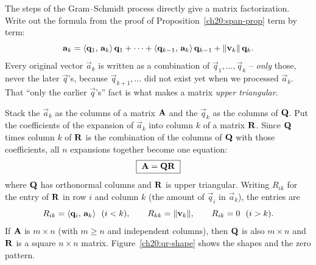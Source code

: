 The steps of the Gram--Schmidt process directly give a matrix factorization.
Write out the formula from the proof of Proposition~\ref{ch20:span-prop} term by term:
\[
  \mathbf{a}_k = \langle \mathbf{q}_1,\, \mathbf{a}_k \rangle\,\mathbf{q}_1
            + \dots
            + \langle \mathbf{q}_{k-1},\, \mathbf{a}_k \rangle\,\mathbf{q}_{k-1}
            + \lVert\mathbf{v}_k\rVert\,\mathbf{q}_k.
\]
Every original vector $\vec{a}_k$ is written as a combination of
$\vec{q}_1,\dots,\vec{q}_k$ -- \emph{only} those, never the later
$\vec{q}$'s, because $\vec{q}_{k+1},\dots$ did not exist yet when we processed
$\vec{a}_k$. That ``only the earlier $\vec{q}$'s'' fact is what makes a matrix
\emph{upper triangular}.

Stack the $\vec{a}_k$ as the columns of a matrix $\mathbf{A}$ and the $\vec{q}_k$ as the
columns of $\mathbf{Q}$. Put the coefficients of the expansion of $\vec{a}_k$ into column $k$ of a
matrix $\mathbf{R}$. Since $\mathbf{Q}$ times column $k$ of $\mathbf{R}$ is the combination of the
columns of $\mathbf{Q}$ with those coefficients, all $n$ expansions together become one equation:
\[
  \boxed{\;\mathbf{A} = \mathbf{Q}\mathbf{R}\;}
\]
where $\mathbf{Q}$ has orthonormal columns and $\mathbf{R}$ is upper triangular. Writing $R_{ik}$
for the entry of $\mathbf{R}$ in row $i$ and column $k$ (the amount of $\vec{q}_i$ in $\vec{a}_k$),
the entries are
\[
  R_{ik} = \langle \mathbf{q}_i,\, \mathbf{a}_k \rangle\ \ (i<k),
  \qquad
  R_{kk} = \lVert\mathbf{v}_k\rVert,
  \qquad
  R_{ik}=0\ \ (i>k).
\]
If $\mathbf{A}$ is $m\times n$ (with $m\ge n$ and independent columns), then $\mathbf{Q}$ is also
$m\times n$ and $\mathbf{R}$ is a square $n\times n$ matrix. Figure~\ref{ch20:qr-shape} shows the
shapes and the zero pattern.

